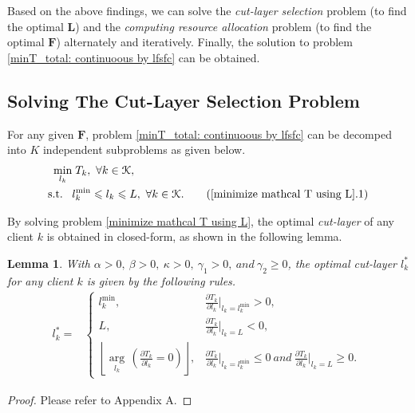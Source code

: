 \documentclass[10pt,journal,transmag]{IEEEtran}
\newtheorem{lemma}{Lemma}
\begin{document}
Based on the above findings, we can solve the \textit{cut-layer selection} problem (to find the optimal \textbf{L}) and the \textit{computing resource allocation} problem (to find the optimal $\textbf{F}$) alternately and iteratively. Finally, the solution to problem \eqref{minT_total: continuoous by lfsfc} can be obtained.

\subsection{Solving The Cut-Layer Selection Problem}
For any given $\textbf{F}$, problem \eqref{minT_total: continuoous by lfsfc} can be decomped into $K$ independent subproblems as given below. 
\begin{alignat}{1}
    \min_{l_k} & \; T_k,\  \forall k \in \mathcal{K}, \label{minimize mathcal T using L} \\
    \mbox{s.t.}\;\;\; 
    & l_k^\text{min} \leqslant l_k \leqslant L,\ \forall k \in \mathcal{K}. \tag{\ref{minimize mathcal T using L}.1} 
\end{alignat}

By solving problem \eqref{minimize mathcal T using L}, the optimal \textit{cut-layer} of any client $k$ is obtained in closed-form, as shown in the following lemma.

\begin{lemma}
    With $\alpha > 0,\ \beta > 0,\ \kappa>0,\ \gamma_1 > 0,\ and\ \gamma_2 \geqslant 0$, the optimal cut-layer $l^*_k$ for any client $k$ is given by the following rules.
    \begin{align} 
        l^*_k = & 
        \begin{cases} 
            l_k^\text{min}, & \frac{\partial T_{k}}{\partial l_k} \big|_{l_k = l_k^\text{min}} > 0,  \\
            L, & \frac{\partial T_{k}}{\partial l_k} \big|_{l_k = L} < 0,\\ 
            \left \lfloor  \underset{l_k}{\operatorname{arg}}\, \left(\frac{\partial T_{k}}{\partial l_k}=0 \right) \right \rfloor , & \frac{\partial T_{k}}{\partial l_k} \big|_{l_k = l_k^\text{min}} \leqslant 0\ and\ \frac{\partial T_{k}}{\partial l_k} \big|_{l_k = L} \geqslant 0. 
        \end{cases} \; \label{The optimal splitting layer of k}
    \end{align}
    \label{lemma: optimal cut-layer}
\end{lemma}
\begin{proof}
    Please refer to Appendix A.
\end{proof}
\end{document}
